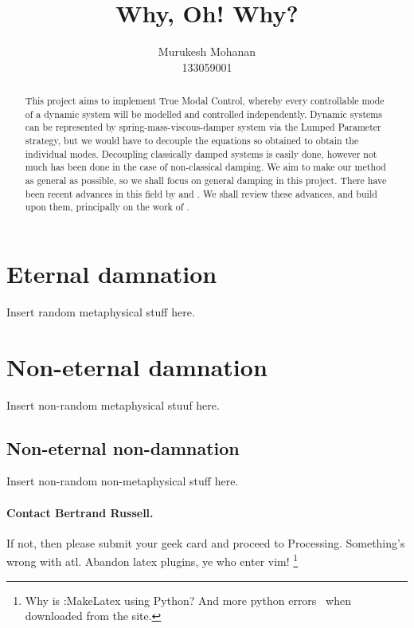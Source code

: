 \documentclass{article}
\title{Why, Oh! Why?}
\author{Murukesh Mohanan\\133059001}
\begin{document}
\begin{abstract}
This project aims to implement True Modal Control, whereby every 
controllable mode of a dynamic system will be modelled and controlled 
independently. Dynamic systems can be represented by spring-mass-viscous-damper system  via the Lumped Parameter strategy, but we would have to 
decouple the equations so obtained to obtain the individual modes.
Decoupling classically damped systems is easily done, however not much has 
been done in the case of non-classical damping. We aim to make our method as 
general as possible, so we shall focus on general damping in this project. 
There have been recent advances in this field by 
\citet{GARVEY2002885,GARVEY2002911} and \citet{Chu200896,Chu2008112}. We 
shall review these advances, and build upon them, principally on the work of 
\citet{Chu200896}.
\end{abstract}
\maketitle
\tableofcontents
\listoffigures
\newpage
\section{Eternal damnation}
Insert random metaphysical stuff here.
\section{Non-eternal damnation}
Insert non-random metaphysical stuuf here.
\subsection{Non-eternal non-damnation}
Insert non-random non-metaphysical stuff here.

\paragraph{Contact Bertrand Russell.}
If not, then please submit your geek card and proceed to Processing.
Something's wrong with atl. Abandon latex plugins, ye who enter vim!
\footnote{Why is :MakeLatex using Python? And more python errors \
	when downloaded from the site.}
\end{document}

